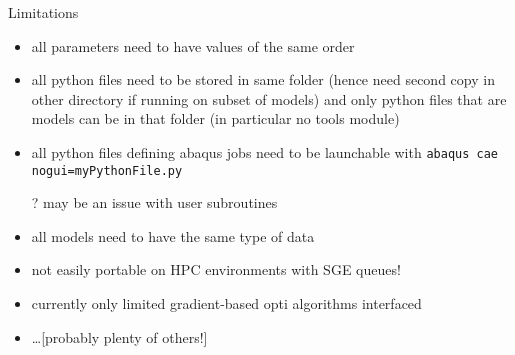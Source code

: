\begin{frame}{Limitations}

\begin{itemize}
\item all parameters need to have values of the same order
\item all python files need to be stored in same folder (hence need second copy in other directory if running on subset of models) and only python files that are models can be in that folder (in particular no tools module)
\item all python files defining abaqus jobs need to be launchable with
  \texttt{abaqus cae nogui=myPythonFile.py}
  
  ? may be an issue with user subroutines
\item all models need to have the same type of data
\item not easily portable on HPC environments with SGE queues!
\item currently only limited gradient-based opti algorithms interfaced
\item \dots [probably plenty of others!]
\end{itemize}

\end{frame}
